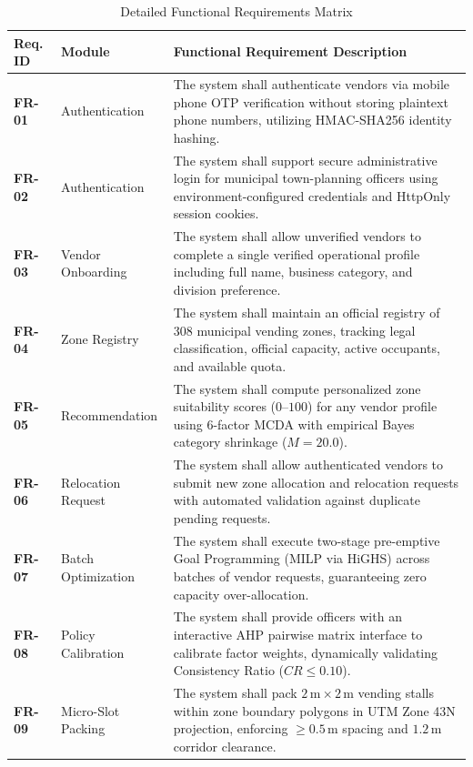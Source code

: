 \begin{table}[htbp]
\caption{Detailed Functional Requirements Matrix}
\label{tab:functional_requirements}
\centering
\small
\begin{tabularx}{\textwidth}{lp{}X}
\toprule
\textbf{Req. ID} & \textbf{Module} & \textbf{Functional Requirement Description} \\
\midrule
\textbf{FR-01} & Authentication & The system shall authenticate vendors via mobile phone OTP verification without storing plaintext phone numbers, utilizing HMAC-SHA256 identity hashing. \\
\textbf{FR-02} & Authentication & The system shall support secure administrative login for municipal town-planning officers using environment-configured credentials and HttpOnly session cookies. \\
\textbf{FR-03} & Vendor Onboarding & The system shall allow unverified vendors to complete a single verified operational profile including full name, business category, and division preference. \\
\textbf{FR-04} & Zone Registry & The system shall maintain an official registry of 308 municipal vending zones, tracking legal classification, official capacity, active occupants, and available quota. \\
\textbf{FR-05} & Recommendation & The system shall compute personalized zone suitability scores ($0$--$100$) for any vendor profile using 6-factor MCDA with empirical Bayes category shrinkage ($M=20.0$). \\
\textbf{FR-06} & Relocation Request & The system shall allow authenticated vendors to submit new zone allocation and relocation requests with automated validation against duplicate pending requests. \\
\textbf{FR-07} & Batch Optimization & The system shall execute two-stage pre-emptive Goal Programming (MILP via HiGHS) across batches of vendor requests, guaranteeing zero capacity over-allocation. \\
\textbf{FR-08} & Policy Calibration & The system shall provide officers with an interactive AHP pairwise matrix interface to calibrate factor weights, dynamically validating Consistency Ratio ($CR \le 0.10$). \\
\textbf{FR-09} & Micro-Slot Packing & The system shall pack $2\,\text{m} \times 2\,\text{m}$ vending stalls within zone boundary polygons in UTM Zone 43N projection, enforcing $\ge 0.5\,\text{m}$ spacing and $1.2\,\text{m}$ corridor clearance. \\

\end{tabularx}
\end{table}
